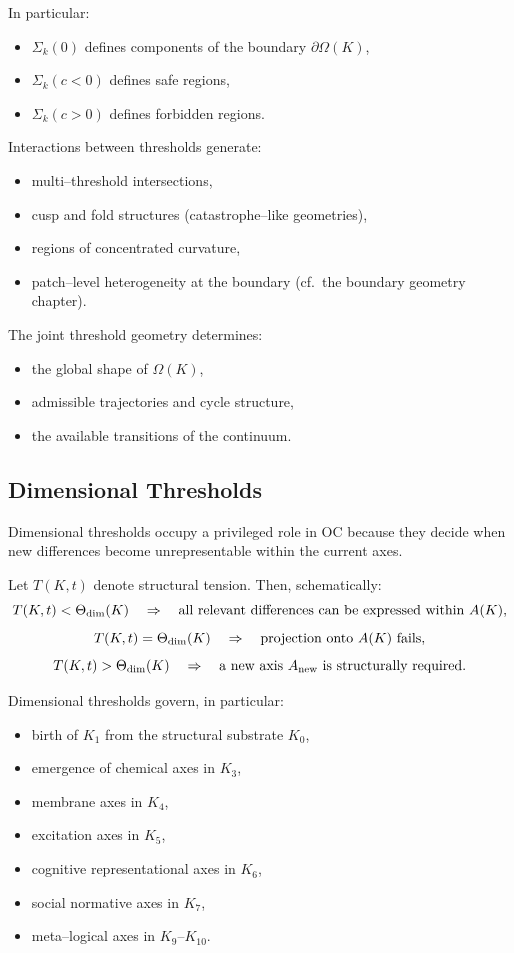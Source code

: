 In particular:
\begin{itemize}
    \item \(\Sigma_k(0)\) defines components of the boundary \(\partial\Omega(K)\),
    \item \(\Sigma_k(c<0)\) defines safe regions,
    \item \(\Sigma_k(c>0)\) defines forbidden regions.
\end{itemize}

Interactions between thresholds generate:
\begin{itemize}
    \item multi–threshold intersections,
    \item cusp and fold structures (catastrophe–like geometries),
    \item regions of concentrated curvature,
    \item patch–level heterogeneity at the boundary
          (cf.~the boundary geometry chapter).
\end{itemize}

The joint threshold geometry determines:
\begin{itemize}
    \item the global shape of \(\Omega(K)\),
    \item admissible trajectories and cycle structure,
    \item the available transitions of the continuum.
\end{itemize}

\subsection{Dimensional Thresholds}

Dimensional thresholds occupy a privileged role in OC because they decide when
new differences become unrepresentable within the current axes.

Let \(T(K,t)\) denote structural tension.
Then, schematically:
\[
  T(K,t) < \Theta_{\rm dim}(K)
   \quad\Rightarrow\quad
   \text{all relevant differences can be expressed within } A(K),
\]
\[
  T(K,t) = \Theta_{\rm dim}(K)
   \quad\Rightarrow\quad
   \text{projection onto } A(K)\ \text{fails},
\]
\[
  T(K,t) > \Theta_{\rm dim}(K)
   \quad\Rightarrow\quad
   \text{a new axis } A_{\rm new} \text{ is structurally required}.
\]

Dimensional thresholds govern, in particular:
\begin{itemize}
    \item birth of \(K_1\) from the structural substrate \(K_0\),
    \item emergence of chemical axes in \(K_3\),
    \item membrane axes in \(K_4\),
    \item excitation axes in \(K_5\),
    \item cognitive representational axes in \(K_6\),
    \item social normative axes in \(K_7\),
    \item meta–logical axes in \(K_9\)–\(K_{10}\).
\end{itemize}

